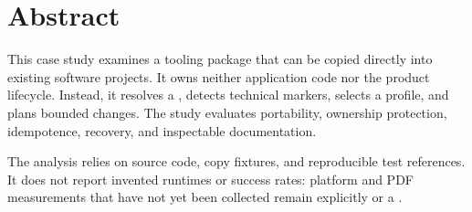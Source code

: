 \section{Abstract}
\label{chap:abstract}

This case study examines a tooling package that can be copied directly into existing
software projects. It owns neither application code nor the product lifecycle. Instead,
it resolves a \ProjectContext{}, detects technical markers, selects a profile, and plans
bounded changes. The study evaluates portability, ownership protection, idempotence,
recovery, and inspectable documentation.

The analysis relies on source code, copy fixtures, and reproducible test references. It
does not report invented runtimes or success rates: platform and PDF measurements that
have not yet been collected remain explicitly \Planned{} or a \Limitation{}.
